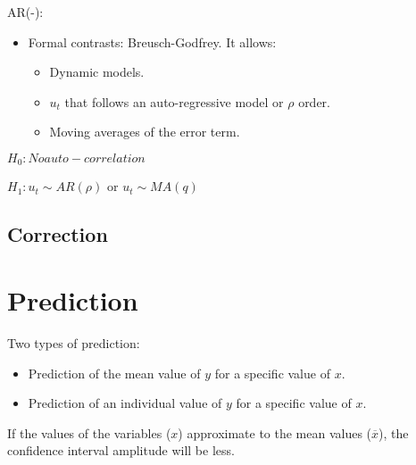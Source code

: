 \documentclass[10pt, a4paper, landscape]{extarticle}
\begin{document}
\begin{multicols}{3}
\begin{multicols}{3}
\columnbreak

AR(-):


\end{multicols}

\begin{itemize}[leftmargin=*]
\item Formal contrasts: Breusch-Godfrey. It allows:
\begin{itemize}[leftmargin=*]
\item Dynamic models.
\item $u_t$ that follows an auto-regressive model or $\rho$ order.
\item Moving averages of the error term.
\end{itemize}
\end{itemize}

$H_0: No auto-correlation$

$H_1: u_t \sim AR(\rho)$ or $u_t \sim MA(q)$

\subsection*{Correction}



\section*{Prediction}

Two types of prediction:

\begin{itemize}[leftmargin=*]
\item Prediction of the mean value of $y$ for a specific value of $x$.
\item Prediction of an individual value of $y$ for a specific value of $x$.
\end{itemize}

If the values of the variables ($x$) approximate to the mean values ($\overline{x}$), the confidence interval amplitude will be less. 





\end{multicols}
\end{document}
